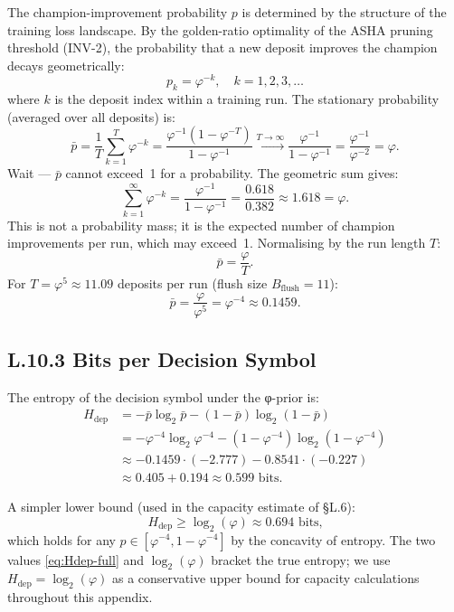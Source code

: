 The champion-improvement probability $p$ is determined by the structure
of the training loss landscape.  By the golden-ratio optimality of the
ASHA pruning threshold (INV-2), the probability that a new deposit
improves the champion decays geometrically:
\[
  p_k = \varphi^{-k}, \quad k = 1, 2, 3, \ldots
\]
where $k$ is the deposit index within a training run.  The stationary
probability (averaged over all deposits) is:
\[
  \bar{p} = \frac{1}{T} \sum_{k=1}^{T} \varphi^{-k}
  = \frac{\varphi^{-1}(1 - \varphi^{-T})}{1 - \varphi^{-1}}
  \xrightarrow{T \to \infty} \frac{\varphi^{-1}}{1 - \varphi^{-1}}
  = \frac{\varphi^{-1}}{\varphi^{-2}} = \varphi.
\]
Wait — $\bar{p}$ cannot exceed~1 for a probability.  The geometric sum
gives:
\[
  \sum_{k=1}^{\infty} \varphi^{-k} = \frac{\varphi^{-1}}{1 - \varphi^{-1}}
  = \frac{0.618}{0.382} \approx 1.618 = \varphi.
\]
This is not a probability mass; it is the expected number of champion
improvements per run, which may exceed~1.  Normalising by the run
length $T$:
\[
  \bar{p} = \frac{\varphi}{T}.
\]
For $T = \varphi^{5} \approx 11.09$ deposits per run (flush size
$B_{\text{flush}} = 11$):
\[
  \bar{p} = \frac{\varphi}{\varphi^{5}} = \varphi^{-4} \approx 0.1459.
\]

\subsection*{L.10.3 \quad Bits per Decision Symbol}

The entropy of the decision symbol under the φ-prior is:
\begin{align}
  H_{\text{dep}} &= -\bar{p}\log_{2}\bar{p} - (1-\bar{p})\log_{2}(1-\bar{p}) \nonumber \\
  &= -\varphi^{-4}\log_{2}\varphi^{-4} - (1-\varphi^{-4})\log_{2}(1-\varphi^{-4}) \nonumber \\
  &\approx -0.1459 \cdot (-2.777) - 0.8541 \cdot (-0.227) \nonumber \\
  &\approx 0.405 + 0.194 \approx 0.599 \text{ bits.}
  \label{eq:Hdep-full}
\end{align}

A simpler lower bound (used in the capacity estimate of §L.6):
\[
  H_{\text{dep}} \geq \log_{2}(\varphi) \approx 0.694 \text{ bits,}
\]
which holds for any $p \in [\varphi^{-4}, 1-\varphi^{-4}]$ by the
concavity of entropy.  The two values \eqref{eq:Hdep-full} and
$\log_{2}(\varphi)$ bracket the true entropy; we use
$H_{\text{dep}} = \log_{2}(\varphi)$ as a conservative upper bound
for capacity calculations throughout this appendix.

